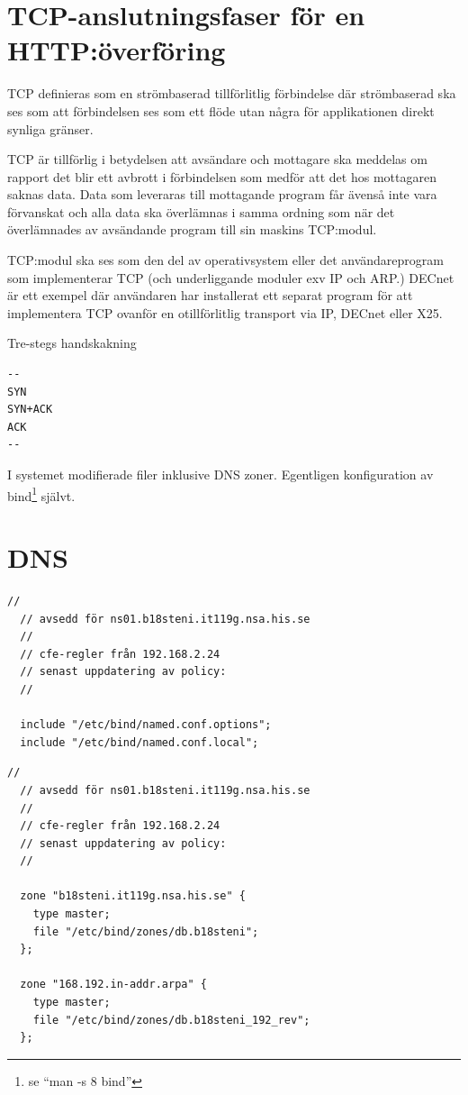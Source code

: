 \documentclass[swedish,10pt,a4paper]{article}
\begin{document}
\section{TCP-anslutningsfaser för en HTTP:överföring }\label{sec:tcp_phases_http}

TCP definieras som en strömbaserad tillförlitlig förbindelse där strömbaserad ska ses som
att förbindelsen ses som ett flöde utan några för applikationen direkt synliga gränser.

TCP är tillförlig i betydelsen att avsändare och mottagare ska meddelas om rapport det blir
ett avbrott i förbindelsen som medför att det hos mottagaren saknas data.
Data som leveraras till mottagande program får ävenså inte vara förvanskat och alla data ska överlämnas
i samma ordning som när det överlämnades av avsändande program till sin maskins TCP:modul.

TCP:modul ska ses som den del av operativsystem eller det användareprogram som implementerar TCP (och
underliggande moduler exv IP och ARP.) DECnet är ett exempel där användaren har installerat ett
separat program för att implementera TCP ovanför en otillförlitlig transport via IP, DECnet eller X25.

Tre-stegs handskakning
\begin{verbatim}
--
SYN
SYN+ACK
ACK
--
\end{verbatim}

\appendix

I systemet modifierade filer inklusive DNS zoner.
Egentligen konfiguration av bind\footnote{se ``man -s 8 bind''} självt.

\section{DNS}\label{sec:appendix_bind_config}

\begin{lstlisting}[caption={/etc/bind/named.conf}]
  //
  // avsedd för ns01.b18steni.it119g.nsa.his.se
  //
  // cfe-regler från 192.168.2.24
  // senast uppdatering av policy:
  //

  include "/etc/bind/named.conf.options";
  include "/etc/bind/named.conf.local";
\end{lstlisting}

\begin{lstlisting}[caption={/etc/bind/named.conf.local}]
  //
  // avsedd för ns01.b18steni.it119g.nsa.his.se
  //
  // cfe-regler från 192.168.2.24
  // senast uppdatering av policy:
  //

  zone "b18steni.it119g.nsa.his.se" {
    type master;
    file "/etc/bind/zones/db.b18steni";
  };

  zone "168.192.in-addr.arpa" {
    type master;
    file "/etc/bind/zones/db.b18steni_192_rev";
  };
\end{lstlisting}
\end{document}
